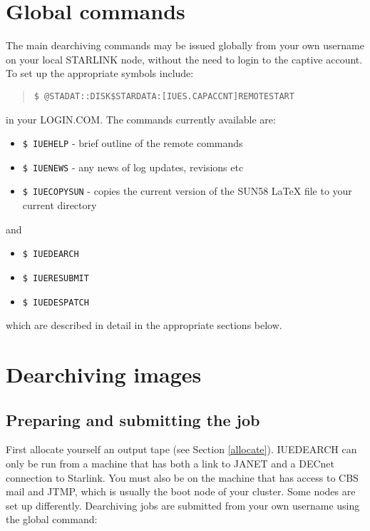 \section {Global commands}
\label{global}

The main dearchiving commands may be issued globally from your own username on 
your local STARLINK node, without the need to login to the captive account.
To set up the appropriate symbols include:

\begin{quote}
{\tt \$ @STADAT::DISK\$STARDATA:[IUES.CAPACCNT]REMOTESTART}
\end{quote}

in your LOGIN.COM. The commands currently available are:

\begin{itemize}

\item {\tt \$ IUEHELP} - brief outline of the remote commands

\item {\tt \$ IUENEWS} - any news of log updates, revisions etc

\item {\tt \$ IUECOPYSUN} - copies the current version of the SUN58 LaTeX file
to your current directory

\end{itemize}

and

\begin{itemize}

\item {\tt \$ IUEDEARCH}

\item {\tt \$ IUERESUBMIT}

\item {\tt \$ IUEDESPATCH}

\end{itemize}

which are described in detail in the appropriate sections below.

\section {Dearchiving images}

\subsection {Preparing and submitting the job}

First allocate yourself an output tape (see Section \ref{allocate}).
IUEDEARCH can only be run from a machine that has both a link to JANET and a
DECnet connection to Starlink. You must also be on the machine that has 
access to CBS mail and JTMP,
which is usually the boot node
of your cluster. Some nodes are set up differently.
Dearchiving jobs are submitted from your own username using the 
global command:

